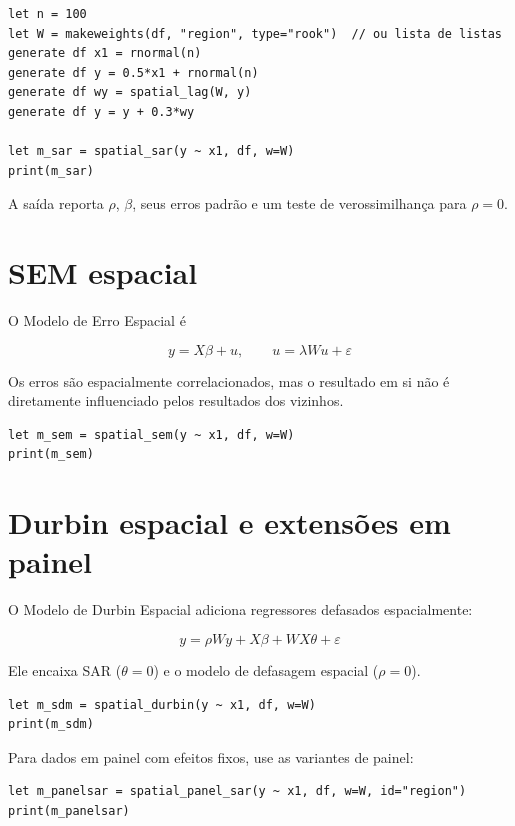 \begin{lstlisting}[caption={SAR espacial}]
let n = 100
let W = makeweights(df, "region", type="rook")  // ou lista de listas
generate df x1 = rnormal(n)
generate df y = 0.5*x1 + rnormal(n)
generate df wy = spatial_lag(W, y)
generate df y = y + 0.3*wy

let m_sar = spatial_sar(y ~ x1, df, w=W)
print(m_sar)
\end{lstlisting}

A saída reporta $\rho$, $\beta$, seus erros padrão e um teste de
verossimilhança para $\rho = 0$.

\section{SEM espacial}

O Modelo de Erro Espacial é

\[
y = X\beta + u, \qquad u = \lambda W u + \varepsilon
\]

Os erros são espacialmente correlacionados, mas o resultado em si não é
diretamente influenciado pelos resultados dos vizinhos.

\begin{lstlisting}[caption={SEM espacial}]
let m_sem = spatial_sem(y ~ x1, df, w=W)
print(m_sem)
\end{lstlisting}

\section{Durbin espacial e extensões em painel}

O Modelo de Durbin Espacial adiciona regressores defasados
espacialmente:

\[
y = \rho W y + X\beta + W X \theta + \varepsilon
\]

Ele encaixa SAR ($\theta = 0$) e o modelo de defasagem espacial
($\rho = 0$).

\begin{lstlisting}[caption={Durbin espacial}]
let m_sdm = spatial_durbin(y ~ x1, df, w=W)
print(m_sdm)
\end{lstlisting}

Para dados em painel com efeitos fixos, use as variantes de painel:

\begin{lstlisting}[caption={SAR em painel}]
let m_panelsar = spatial_panel_sar(y ~ x1, df, w=W, id="region")
print(m_panelsar)
\end{lstlisting}

